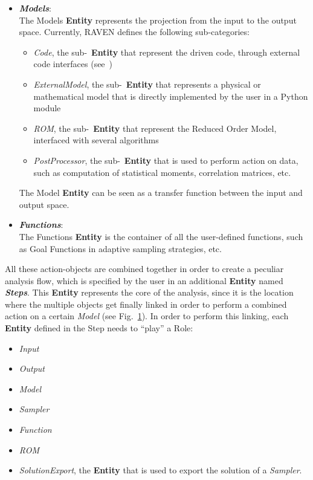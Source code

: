 \begin{itemize}
\begin{figure}[h!]
  \label{fig:ExampleStepEntity}
\end{figure}
  \item \textit{\textbf{Models}}:
  \\ The Models \textbf{Entity}  represents the projection from the input to the output space. Currently, RAVEN defines the 
  following sub-categories:
      \begin{itemize}
       \item \textit{Code}, the sub-~\textbf{Entity} that represent the driven code, through external code interfaces (see~\cite{RAVENuserManual})
       \item  \textit{ExternalModel}, the sub-~\textbf{Entity} that represents a physical or mathematical model that is 
       directly implemented by the user in a Python module
      \item \textit{ROM}, the sub-~\textbf{Entity} that represent the Reduced Order Model, interfaced with several algorithms
       \item \textit{PostProcessor}, the sub-~\textbf{Entity} that is used to perform action on data, such as computation of
       statistical moments, correlation matrices, etc.
      \end{itemize}
      The Model \textbf{Entity} can be seen as a transfer function between the input and output space.
  \item \textit{\textbf{Functions}}:
   \\ The Functions \textbf{Entity} is the container of all the user-defined functions, such as Goal Functions in adaptive 
   sampling strategies, etc.
\end{itemize}
All these action-objects are combined together in order to create a peculiar analysis flow, which is specified
by the user in an additional \textbf{Entity} named \textit{\textbf{Steps}}. This \textbf{Entity} represents the core of the analysis, since it is the location where the multiple objects get finally linked in order to perform a combined action on a certain \textit{Model} (see Fig.~\ref{fig:ExampleStepEntity}). In order to perform this linking, each \textbf{Entity} defined in the Step needs to ``play'' a Role:
\begin{itemize}
  \item \textit{Input}
  \item \textit{Output}
  \item \textit{Model}
  \item \textit{Sampler}
  \item \textit{Function}
  \item \textit{ROM}
  \item \textit{SolutionExport}, the \textbf{Entity} that is used to export the solution of a \textit{Sampler}.
\end{itemize}
